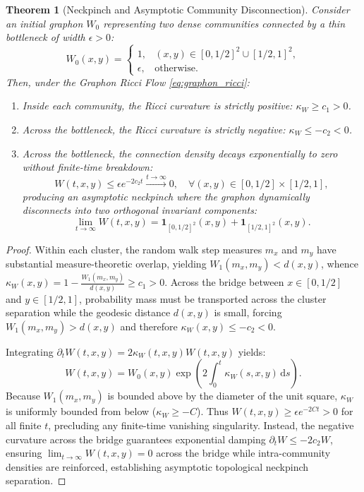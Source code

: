 \documentclass[11pt,a4paper,reqno]{amsart}
\newtheorem{theorem}{Theorem}[section]
\theoremstyle{definition}
\numberwithin{equation}{section}
\newcommand{\dif}{\,\mathrm{d}}
\begin{document}
\begin{theorem}[Neckpinch and Asymptotic Community Disconnection]
\label{thm:ricci_neckpinch}
Consider an initial graphon $W_0$ representing two dense communities connected by a thin bottleneck of width $\epsilon > 0$:
\begin{equation}
    W_0(x, y) = \begin{cases} 1, & (x, y) \in [0, 1/2]^2 \cup [1/2, 1]^2, \\ \epsilon, & \text{otherwise}. \end{cases}
\end{equation}
Then, under the Graphon Ricci Flow \eqref{eq:graphon_ricci}:
\begin{enumerate}[label=(\roman*)]
    \item Inside each community, the Ricci curvature is strictly positive: $\kappa_W \ge c_1 > 0$.
    \item Across the bottleneck, the Ricci curvature is strictly negative: $\kappa_W \le -c_2 < 0$.
    \item Across the bottleneck, the connection density decays exponentially to zero without finite-time breakdown:
    \begin{equation}
        W(t, x, y) \le \epsilon e^{-2 c_2 t} \xrightarrow{t \to \infty} 0, \quad \forall (x, y) \in [0, 1/2] \times [1/2, 1],
    \end{equation}
    producing an asymptotic neckpinch where the graphon dynamically disconnects into two orthogonal invariant components:
    \begin{equation}
        \lim_{t \to \infty} W(t, x, y) = \mathbf{1}_{[0, 1/2]^2}(x, y) + \mathbf{1}_{[1/2, 1]^2}(x, y).
    \end{equation}
\end{enumerate}
\end{theorem}
\begin{proof}
Within each cluster, the random walk step measures $m_x$ and $m_y$ have substantial measure-theoretic overlap, yielding $W_1(m_x, m_y) < d(x, y)$, whence $\kappa_W(x, y) = 1 - \frac{W_1(m_x, m_y)}{d(x, y)} \ge c_1 > 0$. Across the bridge between $x \in [0, 1/2]$ and $y \in [1/2, 1]$, probability mass must be transported across the cluster separation while the geodesic distance $d(x, y)$ is small, forcing $W_1(m_x, m_y) > d(x, y)$ and therefore $\kappa_W(x, y) \le -c_2 < 0$. 

Integrating $\partial_t W(t, x, y) = 2 \kappa_W(t, x, y) W(t, x, y)$ yields:
\begin{equation}
    W(t, x, y) = W_0(x, y) \exp\left( 2 \int_0^t \kappa_W(s, x, y) \dif s \right).
\end{equation}
Because $W_1(m_x, m_y)$ is bounded above by the diameter of the unit square, $\kappa_W$ is uniformly bounded from below ($\kappa_W \ge -C$). Thus $W(t, x, y) \ge \epsilon e^{-2Ct} > 0$ for all finite $t$, precluding any finite-time vanishing singularity. Instead, the negative curvature across the bridge guarantees exponential damping $\partial_t W \le -2 c_2 W$, ensuring $\lim_{t \to \infty} W(t, x, y) = 0$ across the bridge while intra-community densities are reinforced, establishing asymptotic topological neckpinch separation.
\end{proof}
\end{document}
